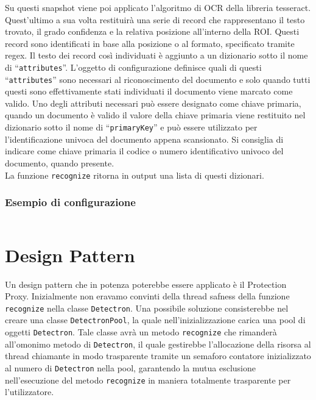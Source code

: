 \documentclass[12pt,a4paper]{article}
\begin{document}
Su questi snapshot viene poi applicato l'algoritmo di OCR della libreria
tesseract. Quest'ultimo a sua volta restituirà una serie di record che
rappresentano il testo trovato, il grado confidenza e la relativa
posizione all'interno della ROI. Questi record sono identificati in base
alla posizione o al formato, specificato tramite regex. Il testo dei
record così individuati è aggiunto a un dizionario sotto il nome di
``\texttt{attributes}''. L'oggetto di configurazione definisce quali di
questi ``\texttt{attributes}'' sono necessari al riconoscimento del
documento e solo quando tutti questi sono effettivamente stati
individuati il documento viene marcato come valido. Uno degli attributi
necessari può essere designato come chiave primaria, quando un documento
è valido il valore della chiave primaria viene restituito nel dizionario
sotto il nome di ``\texttt{primaryKey}'' e può essere utilizzato per
l'identificazione univoca del documento appena scansionato. Si consiglia
di indicare come chiave primaria il codice o numero identificativo
univoco del documento, quando presente.\\
La funzione \texttt{recognize} ritorna in output una lista di questi
dizionari.

\pagebreak

\subsubsection{Esempio di configurazione}

\inputminted{python}{config.py}

\pagebreak

\section{Design Pattern}

Un design pattern che in potenza poterebbe essere applicato è il
Protection Proxy. Inizialmente non eravamo convinti della thread safness
della funzione \texttt{recognize} nella classe \texttt{Detectron}. Una
possibile soluzione consisterebbe nel creare una classe
\texttt{DetectronPool}, la quale nell'inizializzazione carica una pool
di oggetti \texttt{Detectron}. Tale classe avrà un metodo
\texttt{recognize} che rimanderà all'omonimo metodo di
\texttt{Detectron}, il quale gestirebbe l'allocazione della risorsa al
thread chiamante in modo trasparente tramite un semaforo contatore
inizializzato al numero di \texttt{Detectron} nella pool, garantendo la
mutua esclusione nell'esecuzione del metodo \texttt{recognize} in
maniera totalmente trasparente per l'utilizzatore.
\end{document}
